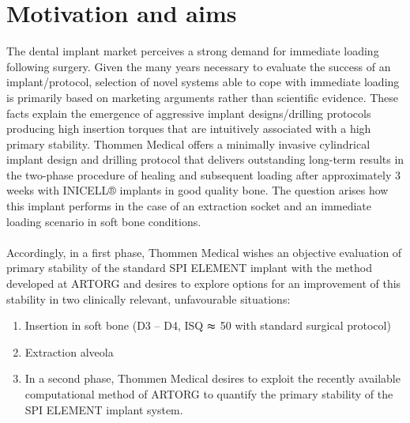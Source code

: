 \documentclass[12pt, a4paper, twoside]{report}
\begin{document}
\section{Motivation and aims}
%
The dental implant market perceives a strong demand for immediate loading following surgery.
Given the many years necessary to evaluate the success of an implant/protocol, selection of novel systems able to cope with immediate loading is primarily based on marketing arguments rather than scientific evidence. These facts explain the emergence of aggressive implant designs/drilling protocols producing high insertion torques that are intuitively associated with a high primary stability. Thommen Medical offers a minimally invasive cylindrical implant design and drilling protocol that delivers outstanding long-term results in the two-phase procedure of healing and subsequent loading after approximately 3 weeks with INICELL® implants in good quality bone. The question arises how this implant performs in the case of an extraction socket and an immediate loading scenario in soft bone conditions.\\
\\
Accordingly, in a first phase, Thommen Medical wishes an objective evaluation of primary stability of the standard SPI ELEMENT implant with the method developed at ARTORG and desires to explore options for an improvement of this stability in two clinically relevant, unfavourable situations:
%
\begin{enumerate}
\item Insertion in soft bone (D3 – D4, ISQ $\thickapprox$ 50 with standard surgical protocol)
\item Extraction alveola
\item In a second phase, Thommen Medical desires to exploit the recently available computational method of ARTORG to quantify the primary stability of the SPI ELEMENT implant system.
\end{enumerate}
%
%
%
%
%
\newpage
%
%
\end{document}
